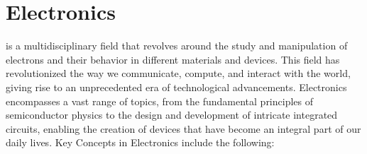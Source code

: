 \chapter{Electronics}
\thispagestyle{fancy}

 is a multidisciplinary field that revolves around the study and manipulation of electrons and their behavior in different materials and devices. This field has revolutionized the way we communicate, compute, and interact with the world, giving rise to an unprecedented era of technological advancements. Electronics encompasses a vast range of topics, from the fundamental principles of semiconductor physics to the design and development of intricate integrated circuits, enabling the creation of devices that have become an integral part of our daily lives. Key Concepts in Electronics include the following:

